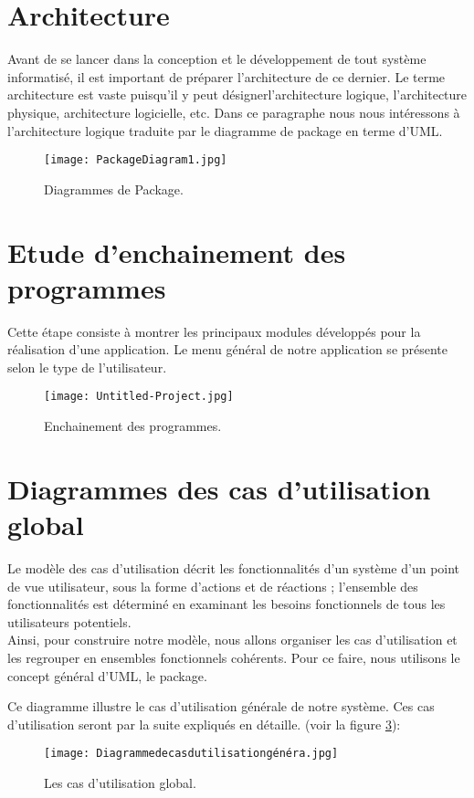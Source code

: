 \section{Architecture}
Avant de se lancer dans la conception et le développement de tout système informatisé, il est
important de préparer l’architecture de ce dernier. Le terme architecture est vaste puisqu’il y
peut désignerl’architecture logique, l’architecture physique, architecture logicielle, etc. Dans
ce paragraphe nous nous intéressons à l’architecture logique traduite par le diagramme de
package en terme d’UML.
\begin{figure}[ht]
	\centering
	\texttt{[image: PackageDiagram1.jpg]}
	\caption{Diagrammes de Package.}
	\label{fig:Diagrammes de Package}
\end{figure}
\FloatBarrier

    \section{ Etude d’enchainement des programmes}
Cette étape consiste à montrer les principaux modules développés pour la réalisation
d’une application.
Le menu général de notre application se présente selon le type de l’utilisateur.
\begin{figure}[ht]
	\centering
	\texttt{[image: Untitled-Project.jpg]}
	\caption{Enchainement des programmes.}
	\label{fig:enchainement des programmes}
\end{figure}
\FloatBarrier 

\section{Diagrammes des cas d'utilisation global}
Le modèle des cas d’utilisation décrit les fonctionnalités d’un système d’un point de vue utilisateur, sous la forme d’actions et de réactions ; l’ensemble des fonctionnalités est déterminé en examinant les besoins fonctionnels de tous les utilisateurs potentiels.\\
Ainsi, pour construire notre modèle, nous allons organiser les cas d’utilisation et les regrouper en ensembles fonctionnels cohérents. Pour ce faire, nous utilisons le concept général d’UML, le package.


Ce diagramme illustre le cas d’utilisation générale de notre système. Ces cas d’utilisation seront par la suite expliqués en détaille. (voir la figure \ref{fig:UseCaseAdmin}):
\begin{figure}[ht]
  \centering
  \texttt{[image: Diagrammedecasdutilisationgénéra.jpg]}
  \caption{Les cas d'utilisation global.}
  \label{fig:UseCaseAdmin}
\end{figure}
\FloatBarrier


